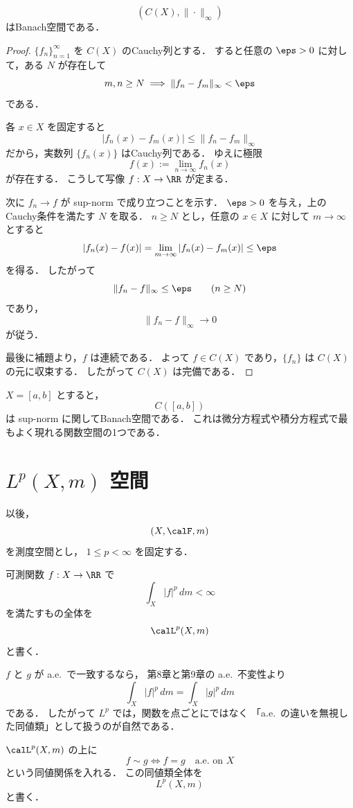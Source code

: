 \begin{theorem}
\[
(C(X),\|\cdot\|_\infty)
\]
はBanach空間である．
\end{theorem}
\begin{proof}
$\{f_n\}_{n=1}^{\infty}$ を $C(X)$ のCauchy列とする．
すると任意の $\eps>0$ に対して，ある $N$ が存在して
\[
m,n\ge N \implies \|f_n-f_m\|_\infty<\eps
\]
である．

各 $x\in X$ を固定すると
\[
|f_n(x)-f_m(x)|\le \|f_n-f_m\|_\infty
\]
だから，実数列 $\{f_n(x)\}$ はCauchy列である．
ゆえに極限
\[
f(x):=\lim_{n\to\infty}f_n(x)
\]
が存在する．
こうして写像 $f:X\to\RR$ が定まる．

次に $f_n\to f$ が sup-norm で成り立つことを示す．
$\eps>0$ を与え，上のCauchy条件を満たす $N$ を取る．
$n\ge N$ とし，任意の $x\in X$ に対して $m\to\infty$ とすると
\[
|f_n(x)-f(x)|
=
\lim_{m\to\infty}|f_n(x)-f_m(x)|
\le \eps
\]
を得る．
したがって
\[
\|f_n-f\|_\infty\le \eps
\qquad (n\ge N)
\]
であり，
\[
\|f_n-f\|_\infty\to 0
\]
が従う．

最後に補題より，$f$ は連続である．
よって $f\in C(X)$ であり，$\{f_n\}$ は $C(X)$ の元に収束する．
したがって $C(X)$ は完備である．
\end{proof}

\begin{example}
$X=[a,b]$ とすると，
\[
C([a,b])
\]
は sup-norm に関してBanach空間である．
これは微分方程式や積分方程式で最もよく現れる関数空間の1つである．
\end{example}

\section{\texorpdfstring{$L^p(X,m)$}{Lp(X,m)} 空間}

以後，
\[
(X,\calF,m)
\]
を測度空間とし，
$1\le p<\infty$ を固定する．

\begin{definition}
可測関数 $f:X\to\RR$ で
\[
\int_X |f|^p\,dm<\infty
\]
を満たすもの全体を
\[
\calL^p(X,m)
\]
と書く．
\end{definition}

\begin{remark}
$f$ と $g$ が a.e.\ で一致するなら，
第8章と第9章の a.e.\ 不変性より
\[
\int_X |f|^p\,dm=\int_X |g|^p\,dm
\]
である．
したがって $L^p$ では，関数を点ごとにではなく
「a.e.\ の違いを無視した同値類」として扱うのが自然である．
\end{remark}

\begin{definition}[\texorpdfstring{$L^p(X,m)$}{Lp(X,m)}]
$\calL^p(X,m)$ の上に
\[
f\sim g
\iff
f=g \quad \text{a.e.\ on } X
\]
という同値関係を入れる．
この同値類全体を
\[
L^p(X,m)
\]
と書く．
\end{definition}

